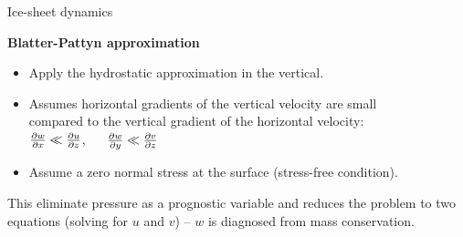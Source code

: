 \documentclass[aspectratio=169,xcolor=dvipsnames]{beamer}
\begin{document}
\begin{frame}[t]{Ice-sheet dynamics}

\vspace{-1.0em}

\begin{center}
\textbf{{\large
Blatter-Pattyn approximation
}}
\end{center}

\small 
\centering

\vspace{1.5em}

\begin{minipage}{0.8\textwidth}
{\flushleft

\begin{itemize}
    \item Apply the hydrostatic approximation in the vertical.
    \item Assumes horizontal gradients of the vertical velocity are small \\ compared to the vertical gradient of the horizontal velocity:  \\
    \vspace{0.3em}
    \hspace{70pt} $\pdv{w}{x} \ll \pdv{u}{z}$, $\quad$ $\pdv{w}{y} \ll \pdv{v}{z}$
    \item Assume a zero normal stress at the surface (stress-free condition).
\end{itemize}

\vspace{2.0em}

This eliminate pressure as a prognostic variable and reduces the problem to two equations (solving for $u$ and $v$) -- $w$ is diagnosed from mass conservation.

}
\end{minipage}

\end{frame}
\end{document}
